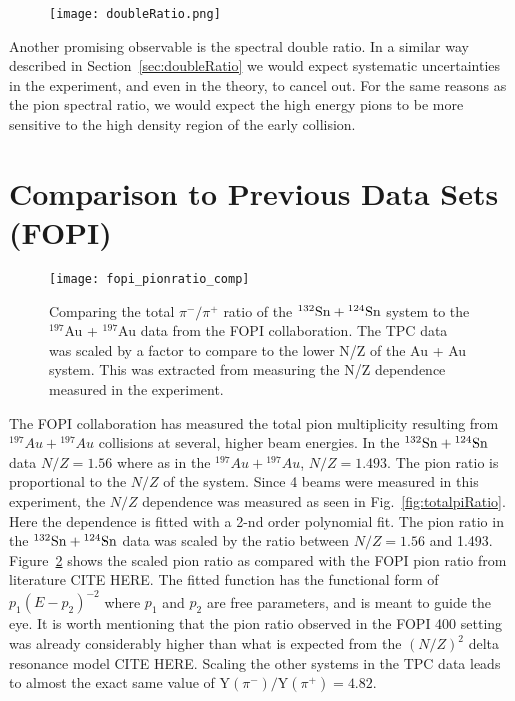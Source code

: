 \begin{figure}[!htb]
\centering
\texttt{[image: doubleRatio.png]}
\caption{}
\label{fig:spectraDR}
\end{figure}

Another promising observable is the spectral double ratio. In a similar way described in Section~\ref{sec:doubleRatio} we would expect systematic uncertainties in the experiment, and even in the theory, to cancel out. For the same reasons as the pion spectral ratio, we would expect the high energy pions to be more sensitive to the high density region of the early collision. 



\section{Comparison to Previous Data Sets (FOPI)}


\begin{figure}[!htb]
\centering
\texttt{[image: fopi\_pionratio\_comp]}
\caption{Comparing the total $\pi^-/\pi^+$ ratio of the ${}^{132}\mathrm{Sn} + {}^{124}\mathrm{Sn}$ system to the ${}^{197}$Au + ${}^{197}$Au data from the FOPI collaboration. The \spirit TPC data was scaled by a factor to compare to the lower N/Z of the Au + Au system. This was extracted from measuring the N/Z dependence measured in the experiment. }
\label{fig:fopiPionRatio}
\end{figure}

The FOPI collaboration has measured the total pion multiplicity resulting from ${}^{197}Au + {}^{197}Au$ collisions at several, higher beam energies. In the ${}^{132}\mathrm{Sn} + {}^{124}\mathrm{Sn}$ data  $N/Z=1.56$ where as in the ${}^{197}Au + {}^{197}Au$, $N/Z=1.493$. The pion ratio is proportional to the $N/Z$ of the system. Since 4 beams were measured in this experiment, the $N/Z$ dependence was measured as seen in Fig.~\ref{fig:totalpiRatio}. Here the dependence is fitted with a 2-nd order polynomial fit. The pion ratio in the ${}^{132}\mathrm{Sn} + {}^{124}\mathrm{Sn}$ data  was scaled by the ratio between $N/Z=1.56$ and 1.493. Figure~\ref{fig:fopiPionRatio} shows the scaled pion ratio as compared with the FOPI pion ratio from literature CITE HERE. The fitted function has the functional form of $p_1(E - p_2)^{-2}$ where $p_1$ and $p_2$ are free parameters, and is meant to guide the eye. It is worth mentioning that the pion ratio observed in the FOPI \SI{400}{\MeVA} setting was already considerably higher than what is expected from the $(N/Z)^2$ delta resonance model CITE HERE. Scaling the other systems in the \spirit TPC data leads to almost the exact same value of $\mathrm{Y}(\pi^-)/\mathrm{Y}(\pi^+) = \num{4.82}$.



